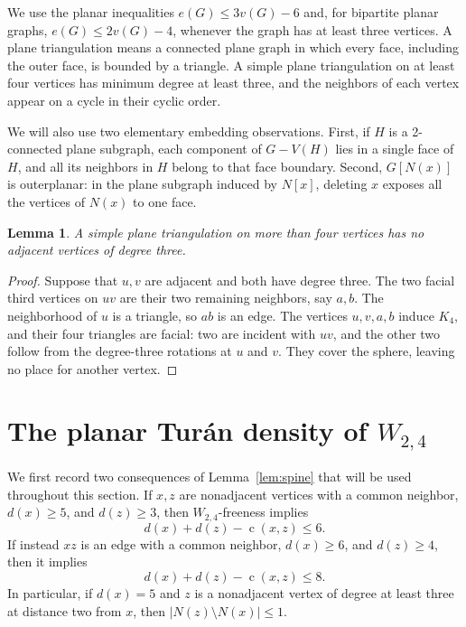 \documentclass[11pt,a4paper]{article}
\newtheorem{lemma}[theorem]{Lemma}
\theoremstyle{remark}
\newcommand{\cdeg}{\operatorname{c}}
\begin{document}
We use the planar inequalities $e(G)\le3v(G)-6$ and, for bipartite planar graphs, $e(G)\le2v(G)-4$, whenever the graph has at least three vertices. A plane triangulation means a connected plane graph in which every face, including the outer face, is bounded by a triangle. A simple plane triangulation on at least four vertices has minimum degree at least three, and the neighbors of each vertex appear on a cycle in their cyclic order.

We will also use two elementary embedding observations. First, if $H$ is a 2-connected plane subgraph, each component of $G-V(H)$ lies in a single face of $H$, and all its neighbors in $H$ belong to that face boundary. Second, $G[N(x)]$ is outerplanar: in the plane subgraph induced by $N[x]$, deleting $x$ exposes all the vertices of $N(x)$ to one face.

\begin{lemma}\label{lem:adjacent-three}
A simple plane triangulation on more than four vertices has no adjacent vertices of degree three.
\end{lemma}

\begin{proof}
Suppose that $u,v$ are adjacent and both have degree three. The two facial third vertices on $uv$ are their two remaining neighbors, say $a,b$. The neighborhood of $u$ is a triangle, so $ab$ is an edge. The vertices $u,v,a,b$ induce $K_4$, and their four triangles are facial: two are incident with $uv$, and the other two follow from the degree-three rotations at $u$ and $v$. They cover the sphere, leaving no place for another vertex.
\end{proof}




\section{The planar Tur\'an density of \texorpdfstring{$W_{2,4}$}{W(2,4)}}
\label{sec:w24}

We first record two consequences of Lemma~\ref{lem:spine} that will be
used throughout this section. If $x,z$ are nonadjacent vertices with a
common neighbor, $d(x)\geq5$, and $d(z)\geq3$, then $W_{2,4}$-freeness
implies
\begin{equation}\label{eq:w24nonadj}
 d(x)+d(z)-\cdeg(x,z)\leq6.
\end{equation}
If instead $xz$ is an edge with a common neighbor, $d(x)\geq6$, and
$d(z)\geq4$, then it implies
\begin{equation}\label{eq:w24adj}
 d(x)+d(z)-\cdeg(x,z)\leq8.
\end{equation}
In particular, if $d(x)=5$ and $z$ is a nonadjacent vertex of degree
at least three at distance two from $x$, then
$|N(z)\setminus N(x)|\leq1$.
\end{document}
